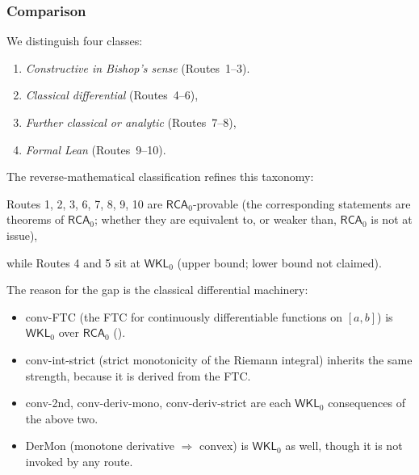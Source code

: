 \documentclass[11pt,reqno]{amsart}
\makeatletter
\theoremstyle{redplain}
\renewenvironment{quotation}
{\list{}{\listparindent\z@
		\itemindent\z@
		\rightmargin\leftmargin
		\parsep\z@}	\item\relax}
{\endlist}
\numberwithin{equation}{section}
\makeatother
\begin{document}
\subsubsection{Comparison}

 \label{sec:convexity-compare}

\begin{quotation}
\noindent We distinguish four classes:
\end{quotation}

\begin{enumerate}
\item \emph{Constructive in Bishop's sense} (Routes~1--3).

\item \emph{Classical differential} (Routes~4--6),

\item \emph{Further classical or analytic} (Routes~7--8),

\item \emph{Formal Lean} (Routes~9--10).
\end{enumerate}

\begin{quotation}
\noindent The reverse-mathematical classification refines this taxonomy:

Routes 1, 2, 3, 6, 7, 8, 9, 10 are $\mathsf{RCA}_{0}$-provable (the
corresponding statements are theorems of $\mathsf{RCA}_0$; whether they are
equivalent to, or weaker than, $\mathsf{RCA}_0$ is not at issue),

while Routes 4 and 5 sit at $\mathsf{WKL}_{0}$ (upper bound; lower bound not
claimed).

\noindent The reason for the gap is the classical differential machinery:
\end{quotation}

\begin{itemize}
\item \textsf{conv-FTC} (the FTC for continuously differentiable functions
on $[a,b]$) is $\mathsf{WKL}_{0}$ over $\mathsf{RCA}_{0}$ (\cite[IV.2.3]%
{Simpson2009}).

\item \textsf{conv-int-strict} (strict monotonicity of the Riemann integral)
inherits the same strength, because it is derived from the FTC.

\item \textsf{conv-2nd}, \textsf{conv-deriv-mono}, \textsf{conv-deriv-strict}
are each $\mathsf{WKL}_{0}$ consequences of the above two.

\item \textsf{DerMon} (monotone derivative $\Rightarrow $ convex) is $%
\mathsf{WKL}_{0}$ as well, though it is not invoked by any route.
\end{itemize}
\end{document}
